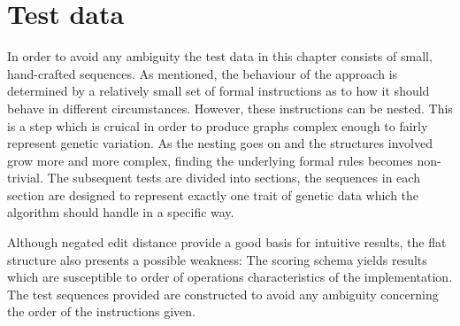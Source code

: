\documentclass[thesis.tex]{subfiles}
\begin{document}
\section{Test data}
In order to avoid any ambiguity the test data in this chapter consists of small, hand-crafted sequences. As mentioned, the behaviour of the approach is determined by a relatively small set of formal instructions as to how it should behave in different circumstances. However, these instructions can be nested. This is a step which is cruical in order to produce graphs complex enough to fairly represent genetic variation. As the nesting goes on and the structures involved grow more and more complex, finding the underlying formal rules becomes non-trivial. The subsequent tests are divided into sections, the sequences in each section are designed to represent exactly one trait of genetic data which the algorithm should handle in a specific way.\\
\par\noindent
Although negated edit distance provide a good basis for intuitive results, the flat structure also presents a possible weakness: The scoring schema yields results which are susceptible to order of operations characteristics of the implementation. The test sequences provided are constructed to avoid any ambiguity concerning the order of the instructions given.
\end{document}
